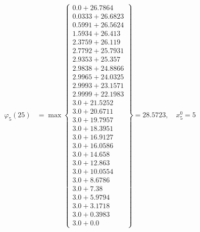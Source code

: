\documentclass{article}
\begin{document}
\begin{align*}
  
\varphi_{5}(25) &= \max \left\{ \begin{array}{c}
0.0 + 26.7864 \\
 0.0333 + 26.6823 \\
 0.5991 + 26.5624 \\
 1.5934 + 26.413 \\
 2.3759 + 26.119 \\
 2.7792 + 25.7931 \\
 2.9353 + 25.357 \\
 2.9838 + 24.8866 \\
 2.9965 + 24.0325 \\
 2.9993 + 23.1571 \\
 2.9999 + 22.1983 \\
 3.0 + 21.5252 \\
 3.0 + 20.6711 \\
 3.0 + 19.7957 \\
 3.0 + 18.3951 \\
 3.0 + 16.9127 \\
 3.0 + 16.0586 \\
 3.0 + 14.658 \\
 3.0 + 12.863 \\
 3.0 + 10.0554 \\
 3.0 + 8.6786 \\
 3.0 + 7.38 \\
 3.0 + 5.9794 \\
 3.0 + 3.1718 \\
 3.0 + 0.3983 \\
 3.0 + 0.0
\end{array} \right\}=28.5723,\quad x_{5}^0=5\\
  
  
  

\end{align*}
\end{document}
